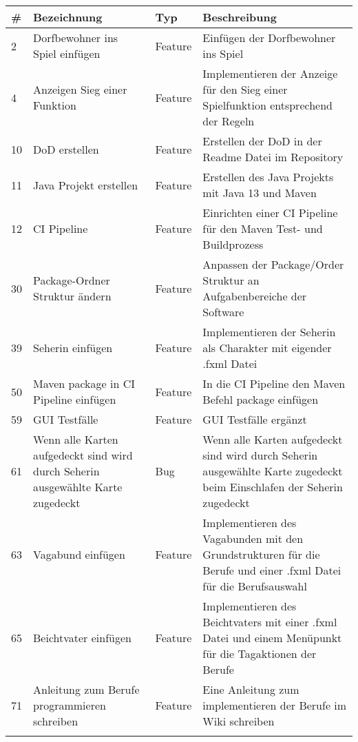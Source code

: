 \begin{tabularx}{\textwidth}{|l|p{4.5cm}|l|X|}
	\hline                                              %
	\textbf{\#}  &    \textbf{Bezeichnung}  &    \textbf{Typ}  & \textbf{Beschreibung}	 \\ 
	\hline \hline   
	\endhead
	
	2 \label{iss:2}	&	Dorfbewohner ins Spiel einfügen	&	Feature	&	Einfügen der Dorfbewohner ins Spiel  \\ \hline
	4 \label{iss:4}	&	Anzeigen Sieg einer Funktion	&	Feature	&	Implementieren der Anzeige für den Sieg einer Spielfunktion entsprechend der Regeln  \\ \hline
	10 \label{iss:10}	&	DoD erstellen	&	Feature	&	Erstellen der DoD in der Readme Datei im Repository  \\ \hline
	11 \label{iss:11}	&	Java Projekt erstellen	&	Feature	&	Erstellen des Java Projekts mit Java 13 und Maven  \\ \hline
	12 \label{iss:12}	&	CI Pipeline	&	Feature	&	Einrichten einer CI Pipeline für den Maven Test- und Buildprozess  \\ \hline
	30 \label{iss:30}	&	Package-Ordner Struktur ändern	&	Feature	&	Anpassen der Package/Order Struktur  an Aufgabenbereiche der Software\\ \hline
	39 \label{iss:39}	&	Seherin einfügen	&	Feature	&	Implementieren der Seherin als Charakter mit eigender .fxml Datei  \\ \hline
	50 \label{iss:50}	&	Maven package in CI Pipeline einfügen	&	Feature	&	In die CI Pipeline den Maven Befehl package einfügen  \\ \hline
	59 \label{iss:59-1}	&	GUI Testfälle	&	Feature	&	GUI Testfälle ergänzt  \\ \hline
	61 \label{iss:61}	&	Wenn alle Karten aufgedeckt sind wird durch Seherin ausgewählte Karte zugedeckt	&	Bug	&	Wenn alle Karten aufgedeckt sind wird durch Seherin ausgewählte Karte zugedeckt beim Einschlafen der Seherin zugedeckt \\ \hline
	63 \label{iss:63}	&	Vagabund einfügen	&	Feature	&	Implementieren des Vagabunden mit den Grundstrukturen für die Berufe und einer .fxml Datei für die Berufsauswahl   \\ \hline
	65 \label{iss:65}	&	Beichtvater einfügen	&	Feature	&	Implementieren des Beichtvaters mit einer .fxml Datei und einem Menüpunkt für die Tagaktionen der Berufe  \\ \hline
	71 \label{iss:71}	&	Anleitung zum Berufe programmieren schreiben	&	Feature	&	Eine Anleitung zum implementieren der Berufe im Wiki schreiben  \\ \hline
\caption{Tätigkeiten Janik Dohrmann}\label{tbl:janik}
\end{tabularx}

